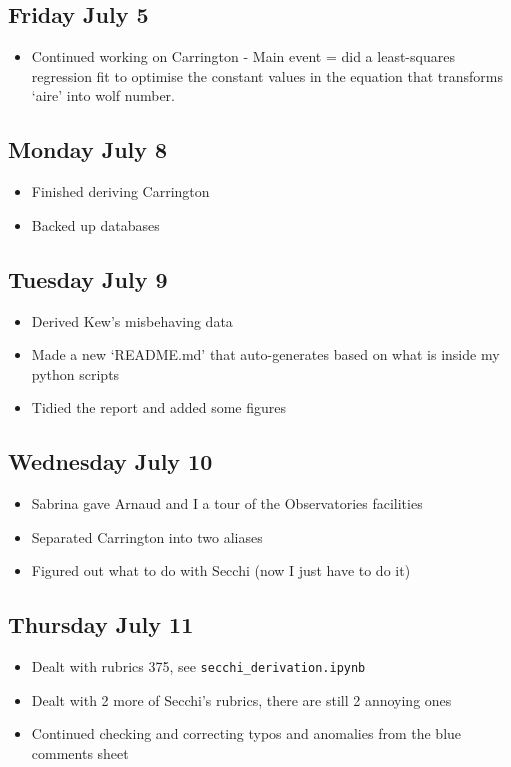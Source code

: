 \documentclass[12pt]{article}
\begin{document}
\subsection{Friday July 5}
\begin{itemize}
    \item Continued working on Carrington - Main event = did a least-squares regression fit to optimise the constant values in the equation that transforms `aire' into wolf number.
\end{itemize}

\subsection{Monday July 8}
\begin{itemize}
    \item Finished deriving Carrington
    \item Backed up databases
\end{itemize}

\subsection{Tuesday July 9}
\begin{itemize}
    \item Derived Kew's misbehaving data
    \item Made a new `README.md' that auto-generates based on what is inside my python scripts
    \item Tidied the report and added some figures
\end{itemize}

\subsection{Wednesday July 10}
\begin{itemize}
    \item Sabrina gave Arnaud and I a tour of the Observatories facilities
    \item Separated Carrington into two aliases
    \item Figured out what to do with Secchi (now I just have to do it)
\end{itemize}

\subsection{Thursday July 11}
\begin{itemize}
    \item Dealt with rubrics 375, see \texttt{secchi\_derivation.ipynb}
    \item Dealt with 2 more of Secchi's rubrics, there are still 2 annoying ones
    \item Continued checking and correcting typos and anomalies from the blue comments sheet
\end{itemize}
\end{document}
